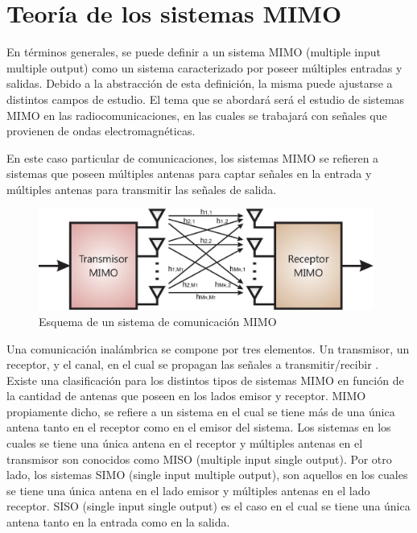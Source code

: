 \chapter{Teoría de los sistemas MIMO}

En términos generales, se puede definir a un sistema MIMO (multiple input multiple output) como un sistema caracterizado por poseer múltiples entradas y salidas. Debido a la abstracción de esta definición, la misma puede ajustarse a distintos campos de estudio. El tema que se abordará será el estudio de sistemas MIMO en las radiocomunicaciones, en las cuales se trabajará con señales que provienen de ondas electromagnéticas. 

En este caso particular de comunicaciones, los sistemas MIMO se refieren a sistemas que poseen múltiples antenas para captar señales en la entrada y múltiples antenas para transmitir las señales de salida.

\begin{figure}[htb!]
        \centering
        \includegraphics[width=11cm]{./figures/C02-MIMO_diagram_01}
        \caption{Esquema de un sistema de comunicación MIMO}
        \label{fig:MIMO_diagram_01}
\end{figure}

Una comunicación inalámbrica se compone por tres elementos. Un transmisor, un receptor, y el canal, en el cual se propagan las señales a transmitir/recibir \cite{Mohammadi}. Existe una clasificación para los distintos tipos de sistemas MIMO en función de la cantidad de antenas que poseen en los lados emisor y receptor. MIMO propiamente dicho, se refiere a un sistema en el cual se tiene más de una única antena tanto en el receptor como en el emisor del sistema. Los sistemas en los cuales se tiene una única antena en el receptor y múltiples antenas en el transmisor son conocidos como MISO (multiple input single output). Por otro lado, los sistemas SIMO (single input multiple output), son aquellos en los cuales se tiene una única antena en el lado emisor y múltiples antenas en el lado receptor. SISO (single input single output) es el caso en el cual se tiene una única antena tanto en la entrada como en la salida.

